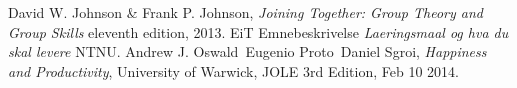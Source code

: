 \begin{thebibliography}{99}	%
		David W. Johnson \& Frank P. Johnson,
		\emph{Joining Together: Group Theory and Group Skills}
		eleventh edition,
		2013.
		EiT Emnebeskrivelse
		\emph{Laeringsmaal og hva du skal levere}
		NTNU.
		Andrew J. Oswald\, Eugenio Proto\, Daniel Sgroi,
		\emph{Happiness and Productivity},
		University of Warwick,
		JOLE 3rd Edition, Feb 10 2014.
\end{thebibliography}